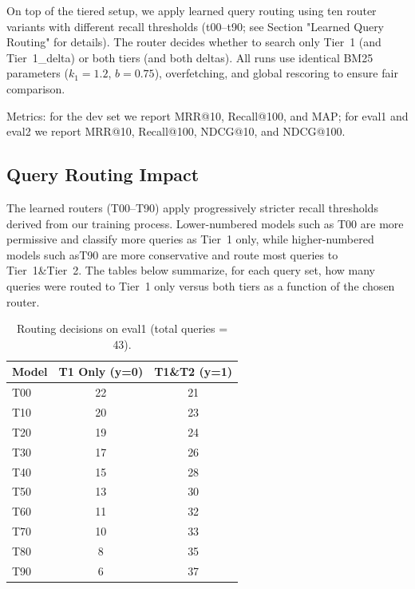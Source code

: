 \documentclass[11pt]{article}
\begin{document}
On top of the tiered setup, we apply learned query routing using ten router variants with different recall thresholds (t00–t90; see Section "Learned Query Routing" for details). The router decides whether to search only Tier~1 (and Tier~1\_delta) or both tiers (and both deltas). All runs use identical BM25 parameters ($k_1 = 1.2$, $b = 0.75$), overfetching, and global rescoring to ensure fair comparison.

Metrics: for the dev set we report MRR@10, Recall@100, and MAP; for eval1 and eval2 we report MRR@10, Recall@100, NDCG@10, and NDCG@100. 

\subsection{Query Routing Impact}
The learned routers (T00--T90) apply progressively stricter recall thresholds derived from our training process. Lower-numbered models such as T00 are more permissive and classify more queries as Tier~1 only, while higher-numbered models such asT90 are more conservative and route most queries to Tier~1\&Tier~2. The tables below summarize, for each query set, how many queries were routed to Tier~1 only versus both tiers as a function of the chosen router.


\begin{table}[H]
\centering
\small
\begin{tabular}{lcc}
\toprule
\textbf{Model} & \textbf{T1 Only (y=0)} & \textbf{T1\&T2 (y=1)} \\
\midrule
T00 & 22 & 21 \\
T10 & 20 & 23 \\
T20 & 19 & 24 \\
T30 & 17 & 26 \\
T40 & 15 & 28 \\
T50 & 13 & 30 \\
T60 & 11 & 32 \\
T70 & 10 & 33 \\
T80 & 8 & 35 \\
T90 & 6 & 37 \\
\bottomrule
\end{tabular}
\caption{Routing decisions on eval1 (total queries = 43).}
\label{tab:router-eval1}
\end{table}
\end{document}
